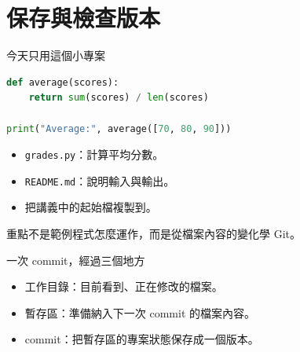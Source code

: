 \documentclass[xetex, unicode, 10pt, aspectratio=169]{beamer}
\begin{document}
\section{保存與檢查版本}

\begin{frame}[fragile]{今天只用這個小專案}
\begin{lstlisting}[language=Python]
def average(scores):
    return sum(scores) / len(scores)

print("Average:", average([70, 80, 90]))
\end{lstlisting}
    \begin{itemize}
        \item \texttt{grades.py}：計算平均分數。
        \item \texttt{README.md}：說明輸入與輸出。
        \item 把講義中的起始檔複製到。
    \end{itemize}
    \pause
    \begin{center}重點不是範例程式怎麼運作，而是從檔案內容的變化學 Git。\end{center}
\end{frame}

\begin{frame}{一次 commit，經過三個地方}
    \begin{center}
    \end{center}
    \begin{itemize}
        \item 工作目錄：目前看到、正在修改的檔案。
        \item 暫存區：準備納入下一次 commit 的檔案內容。
        \item commit：把暫存區的專案狀態保存成一個版本。
    \end{itemize}
\end{frame}
\end{document}
